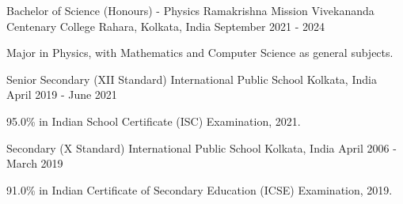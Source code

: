 

\begin{cventries}

  \cventry
    {Bachelor of Science (Honours) - Physics} %
    {Ramakrishna Mission Vivekananda Centenary College} %
    {Rahara, Kolkata, India} %
    {September 2021 - 2024} %
    {
      \begin{cvitems} %
        \item{ Major in Physics, with Mathematics and Computer Science as general subjects.}
      \end{cvitems}
    }

    \cventry
    {Senior Secondary (XII Standard)} %
    {International Public School} %
    {Kolkata, India} %
    {April 2019 - June 2021} %
    {
      \begin{cvitems} %
        \item{95.0\% in Indian School Certificate (ISC) Examination, 2021.}
      \end{cvitems}
    }

    \cventry
    {Secondary (X Standard)} %
    {International Public School} %
    {Kolkata, India} %
    {April 2006 - March 2019} %
    {
      \begin{cvitems} %
        \item {91.0\% in Indian Certificate of Secondary Education (ICSE) Examination, 2019.}
      \end{cvitems}
    }

\end{cventries}
